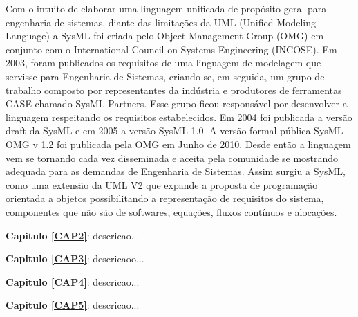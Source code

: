 Com o intuito de elaborar uma linguagem unificada de propósito geral para engenharia de sistemas, diante das limitações da UML (Unified Modeling Language) a SysML foi criada pelo Object Management Group (OMG) em conjunto com o International Council on Systems Engineering (INCOSE). Em 2003, foram publicados os requisitos de uma linguagem de modelagem que servisse para Engenharia de Sistemas, criando-se, em seguida, um grupo de trabalho composto por representantes da indústria e produtores de ferramentas CASE chamado SysML Partners. Esse grupo ficou responsável por desenvolver a linguagem respeitando os requisitos estabelecidos. Em 2004 foi publicada a versão draft da SysML e em 2005 a versão SysML 1.0. A versão formal pública SysML OMG v 1.2 foi publicada pela  OMG em Junho de 2010. Desde então a linguagem vem se tornando cada vez disseminada e aceita pela comunidade se mostrando adequada para as demandas de Engenharia de Sistemas.
Assim surgiu a SysML, como uma extensão da UML V2 que expande a proposta de programação orientada a objetos possibilitando a representação de requisitos do sistema, componentes que não são de softwares, equações, fluxos contínuos e alocações.


\noindent \textbf{Capitulo \ref{CAP2}}: descricao...

\noindent \textbf{Capitulo \ref{CAP3}}: descricaoo...

\noindent \textbf{Capitulo \ref{CAP4}}: descricao...

\noindent \textbf{Capitulo \ref{CAP5}}: descricao...